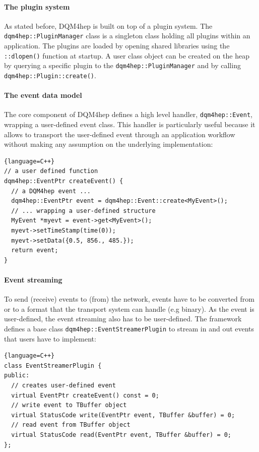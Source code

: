 \documentclass{webofc}
\begin{document}
\paragraph{The plugin system}

As stated before, DQM4hep is built on top of a plugin system.
The \texttt{dqm4hep::PluginManager} class is a singleton class holding all plugins within an application.
The plugins are loaded by opening shared libraries using the \texttt{::dlopen()} function at startup.
A user class object can be created on the heap by querying a specific plugin to the \texttt{dqm4hep::PluginManager} and
by calling \texttt{dqm4hep::Plugin::create()}.

\paragraph{The event data model}

The core component of DQM4hep defines a high level handler, \texttt{dqm4hep::Event}, wrapping a user-defined event class.
This handler is particularly useful because it allows to transport the user-defined event through an application
workflow without making any assumption on the underlying implementation:

\begin{lstlisting}{language=C++}
// a user defined function
dqm4hep::EventPtr createEvent() {
  // a DQM4hep event ...
  dqm4hep::EventPtr event = dqm4hep::Event::create<MyEvent>();
  // ... wrapping a user-defined structure
  MyEvent *myevt = event->get<MyEvent>();
  myevt->setTimeStamp(time(0));
  myevt->setData({0.5, 856., 485.});
  return event;
}
\end{lstlisting}

\paragraph{Event streaming}

To send (receive) events to (from) the network, events have to be converted from or to a format that the transport system can handle (e.g binary).
As the event is user-defined, the event streaming also has to be user-defined.
The framework defines a base class \texttt{dqm4hep::EventStreamerPlugin} to stream in and out events that users have to implement:

\begin{lstlisting}{language=C++}
class EventStreamerPlugin {
public:
  // creates user-defined event
  virtual EventPtr createEvent() const = 0;
  // write event to TBuffer object
  virtual StatusCode write(EventPtr event, TBuffer &buffer) = 0;
  // read event from TBuffer object
  virtual StatusCode read(EventPtr event, TBuffer &buffer) = 0;
};
\end{lstlisting}
\end{document}
